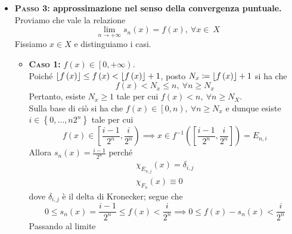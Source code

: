 \begin{demonstration}
\begin{itemize}
\begin{equation*}
	s=\sum_{i=1}^{k}s_i\chi_{A_i}\text{ misurabile}\iff A_i\text{ misurabile}\forall i
\end{equation*}
Gli intervalli di $\left[\frac{i-1}{2^n},\frac{i}{2^n}\right),\ \forall i=1,\ \ldots,\ n2^n$ e $\left[n,+\infty\right)$ sono Borelliani in $\left[0,+\infty\right]$; pertanto, le controimmagini $E_{n,i}$ e $F_n$ tramite $f$ funzione misurabile sono anch'esse misurabili in $X$.
\item  \textbf{\textsc{Passo 3}: approssimazione nel senso della convergenza puntuale.}\\
	Proviamo che vale la relazione
	\begin{equation*}
		\lim_{n\to+\infty}s_n\left(x\right)=f\left(x\right),\ \forall x\in\ X
	\end{equation*}
Fissiamo $x\in X$ e distinguiamo i casi.
\begin{itemize}
	\item \textbf{\textsc{Caso 1:}} $f\left(x\right)\in\left[0,+\infty\right)$.\\
	Poiché $\lfloor f\left(x\right)\rfloor\leq f\left(x\right)<\lfloor f\left(x\right)\rfloor+1$, posto $N_x\coloneqq \lfloor f\left(x\right)\rfloor+1$ si ha che
	\begin{equation*}
		f\left(x\right)< N_x\leq n,\ \forall n\geq N_x
	\end{equation*}
Pertanto, esiste $N_x\geq 1$ tale per cui $f\left(x\right)<n,\ \forall n\geq N_X$.\\
Sulla base di ciò si ha che $f\left(x\right)\in\left[0,n\right),\ \forall n\geq N_x$ e dunque esiste $i\in\left\{0,\ldots,n2^n\right\}$ tale per cui
\begin{equation*}
	f\left(x\right)\in\left[\frac{i-1}{2^n},\frac{i}{2^n}\right)\implies x\in f^{-1}\left(\left[\frac{i-1}{2^n},\frac{i}{2^n}\right]\right)=E_{n,i}
\end{equation*}
Allora $s_n\left(x\right)=\frac{i-1}{2^n}$ perché
\begin{gather*}
	\chi_{E_{n,j}}\left(x\right)=\delta_{i,j}\\
	\chi_{F_n}\left(x\right)\equiv 0
\end{gather*}
dove $\delta_{i,j}$ è il delta di Kronecker; segue che
\begin{equation*}
	0\leq s_n\left(x\right)=\frac{i-1}{2^n}\leq f\left(x\right)< \frac{i}{2^n}\implies 0\leq f\left(x\right)-s_n\left(x\right)<\frac{i}{2^n}
\end{equation*}
Passando al limite
\begin{equation*}

\end{equation*}
\end{itemize}
\end{itemize}
\end{demonstration}
